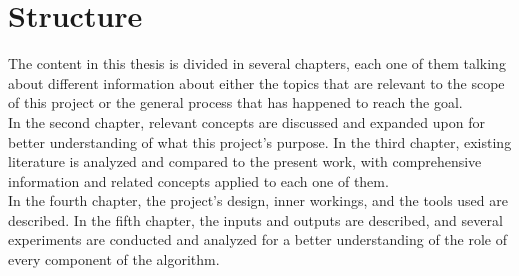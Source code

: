 \section{Structure}
The content in this thesis is divided in several chapters, each one of them talking about different information about either the topics that are relevant to the scope of this project or the general process that has happened to reach the goal.\\
In the second chapter, relevant concepts are discussed and expanded upon for better understanding of what this project's purpose.
In the third chapter, existing literature is analyzed and compared to the present work, with comprehensive information and related concepts applied to each one of them.\\
In the fourth chapter, the project's design, inner workings, and the tools used are described.
In the fifth chapter, the inputs and outputs are described, and several experiments are conducted and analyzed for a better understanding of the role of every component of the algorithm.
\clearpage